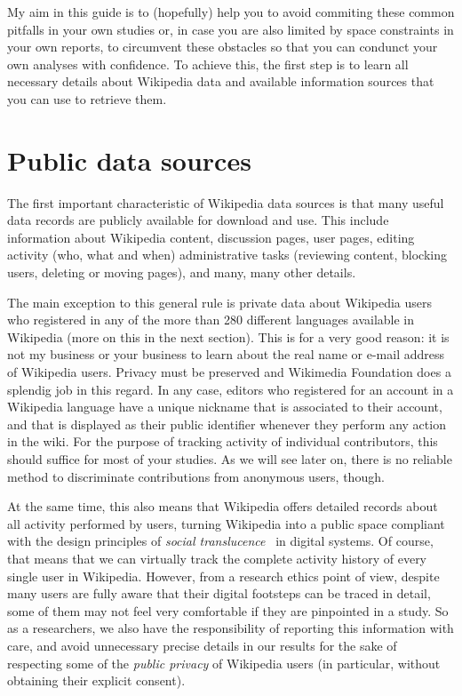 My aim in this guide is to (hopefully) help you to avoid commiting these common
pitfalls in your own studies or, in case you are also limited by space constraints
in your own reports, to circumvent these obstacles so that you can condunct your
own analyses with confidence. To achieve this, the first step is to learn all
necessary details about Wikipedia data and available information sources that you
can use to retrieve them.

\section{Public data sources}
The first important characteristic of Wikipedia data sources is that many useful
data records are publicly available for download and use. This include information
about Wikipedia content, discussion pages, user pages, editing activity (who, what and
when) administrative tasks (reviewing content, blocking users, deleting or moving
pages), and many, many other details.

The main exception to this general rule is private data about Wikipedia users who
registered in any of the more than 280 different languages available in Wikipedia
(more on this in the next section). This is for a very good reason: it is not my
business or your business to learn about the real name or e-mail address of Wikipedia
users. Privacy must be preserved and Wikimedia Foundation does a splendig job in
this regard. In any case, editors who registered for an account in a Wikipedia
language have a unique nickname that is associated to their account, and that 
is displayed as their public identifier whenever they perform any action in the
wiki. For the purpose of tracking activity of individual contributors, this 
should suffice for most of your studies. As we will see later on, there is no
reliable method to discriminate contributions from anonymous users, though.

At the same time, this also means that Wikipedia offers detailed records about all
activity performed by users, turning Wikipedia into a public space compliant with the design
principles of \textit{social translucence}~\cite{Erickson1999} in digital systems. Of course, that means
that we can virtually track the complete activity history of every single user in
Wikipedia. However, from a research ethics point of view, despite many users are
fully aware that their digital footsteps can be traced in detail, some of them may
not feel very comfortable if they are pinpointed in a study. So as a researchers,
we also have the responsibility of reporting this information with care, and avoid
unnecessary precise details in our results for the sake of respecting some of the
\textit{public privacy} of Wikipedia users (in particular, without obtaining their
explicit consent).

